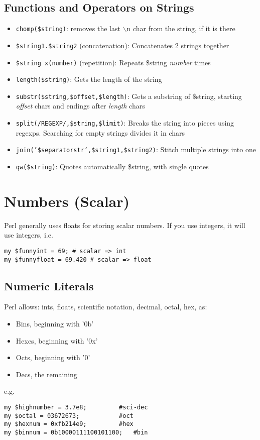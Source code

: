 \documentclass{article}
\begin{document}
\subsection{Functions and Operators on Strings}
\begin{itemize}
\item \texttt{chomp(\$string)}: removes the last $\backslash$n char from the string, if it is there
\item \texttt{\$string1.\$string2} (concatenation): Concatenates 2 strings together
\item \texttt{\$string x(number)} (repetition): Repeats \$string \textit{number} times
\item \texttt{length(\$string)}: Gets the length of the string
\item \texttt{substr(\$string,\$offset,\$length)}: Gets a substring of \$string, starting \textit{offset} chars and endings after \textit{length} chars
\item \texttt{split(/REGEXP/,\$string,\$limit)}: Breaks the string into pieces using regexps. Searching for empty strings divides it in chars
\item \texttt{join('\$separatorstr',\$string1,\$string2)}: Stitch multiple strings into one
\item \texttt{qw(\$string)}: Quotes automatically \$string, with single quotes
\end{itemize}
\section{Numbers (Scalar)}
Perl generally uses floats for storing scalar numbers. If you use integers, it will use integers, i.e.
\begin{verbatim}
my $funnyint = 69; # scalar => int
my $funnyfloat = 69.420 # scalar => float
\end{verbatim}
\subsection{Numeric Literals}
Perl allows: ints, floats, scientific notation, decimal, octal, hex, as:
\begin{itemize}
\item Bins, beginning with '0b'
\item Hexes, beginning with '0x'
\item Octs, beginning with '0'
\item Decs, the remaining
\end{itemize}
e.g.
\begin{verbatim}
my $highnumber = 3.7e8;			#sci-dec
my $octal = 03672673;			#oct
my $hexnum = 0xfb214e9;			#hex
my $binnum = 0b10000111100101100;	#bin
\end{verbatim}
\end{document}
